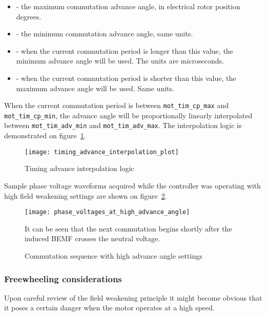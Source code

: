 \documentclass{zubaxdoc}
\begin{document}
\begin{itemize}
\item {} - the maximum commutation advance angle, in electrical rotor position degrees.
\item {} - the minimum commutation advance angle, same units.
\item {} - when the current commutation period is longer than this value,
the minimum advance angle will be used. The units are microseconds.
\item {} - when the current commutation period is shorter than this value,
the maximum advance angle will be used. Same units.
\end{itemize}

When the current commutation period is between \verb|mot_tim_cp_max| and \verb|mot_tim_cp_min|,
the advance angle will be proportionally linearly interpolated between
\verb|mot_tim_adv_min| and \verb|mot_tim_adv_max|.
The interpolation logic is demonstrated on figure~\ref{timing_advance_interpolation_plot}.

\begin{figure}[hbt]
    \centering
    \texttt{[image: timing\_advance\_interpolation\_plot]}
    \caption{Timing advance interpolation logic
    \label{timing_advance_interpolation_plot}}
\end{figure}

Sample phase voltage waveforms acquired while the controller was operating with high field
weakening settings are shown on figure~\ref{phase_voltages_at_high_advance_angle}.

\begin{figure}[hbtp]
    \centering
    \texttt{[image: phase\_voltages\_at\_high\_advance\_angle]}
    \caption{Commutation sequence with high advance angle settings
    \label{phase_voltages_at_high_advance_angle}}
    It can be seen that the next commutation begins shortly after the induced BEMF
    crosses the neutral voltage.
\end{figure}

\subsubsection{Freewheeling considerations}

Upon careful review of the field weakening principle it might become obvious that it poses a certain danger
when the motor operates at a high speed.
\end{document}
